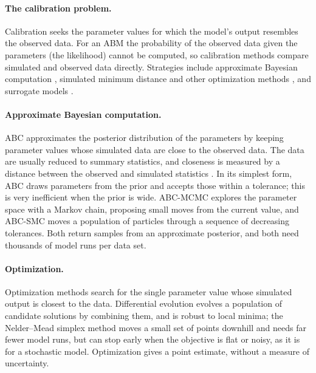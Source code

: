 \documentclass[12pt]{article}
\begin{document}
\paragraph{The calibration problem.} Calibration seeks the parameter values for which the model's
output resembles the observed data. For an ABM the probability of the observed data given the
parameters (the likelihood) cannot be computed, so calibration methods compare simulated and
observed data directly. Strategies include approximate Bayesian computation
\autocite{toniApproximateBayesianComputation2008,gozzi2022preliminary}, simulated minimum distance
and other optimization methods \autocite{platt2020comparison}, and surrogate models
\autocite{lampertiAgentbasedModelCalibration2018,jalalBayCANNStreamliningBayesian2021,zhang2020validation}.

\paragraph{Approximate Bayesian computation.} ABC approximates the posterior distribution of the
parameters by keeping parameter values whose simulated data are close to the observed data. The
data are usually reduced to summary statistics, and closeness is measured by a distance between the
observed and simulated statistics \autocite{beaumont2002approximate}. In its simplest form, ABC
draws parameters from the prior and accepts those within a tolerance; this is very inefficient when
the prior is wide. ABC-MCMC \autocite{marjoramMarkovChainMonte2003} explores the parameter space
with a Markov chain, proposing small moves from the current value, and ABC-SMC
\autocite{toniApproximateBayesianComputation2008,beaumont2009adaptive} moves a population of
particles through a sequence of decreasing tolerances. Both return samples from an approximate
posterior, and both need thousands of model runs per data set.

\paragraph{Optimization.} Optimization methods search for the single parameter value whose simulated
output is closest to the data. Differential evolution \autocite{storn1997differential} evolves a
population of candidate solutions by combining them, and is robust to local minima; the
Nelder--Mead simplex method \autocite{nelder1965simplex} moves a small set of points downhill and
needs far fewer model runs, but can stop early when the objective is flat or noisy, as it is for a
stochastic model. Optimization gives a point estimate, without a measure of uncertainty.
\end{document}
